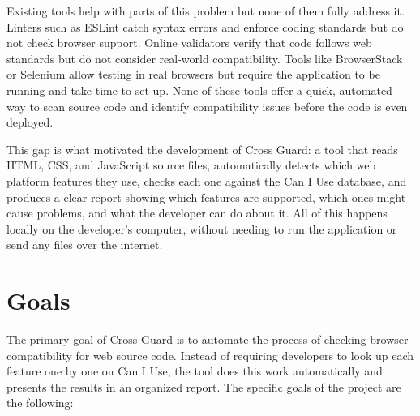 Existing tools help with parts of this problem but none of them fully address it. Linters such as ESLint catch syntax errors and enforce coding standards but do not check browser support. Online validators verify that code follows web standards but do not consider real-world compatibility. Tools like BrowserStack or Selenium allow testing in real browsers but require the application to be running and take time to set up. None of these tools offer a quick, automated way to scan source code and identify compatibility issues before the code is even deployed.

This gap is what motivated the development of Cross Guard: a tool that reads HTML, CSS, and JavaScript source files, automatically detects which web platform features they use, checks each one against the Can I Use database, and produces a clear report showing which features are supported, which ones might cause problems, and what the developer can do about it. All of this happens locally on the developer's computer, without needing to run the application or send any files over the internet.

\section{Goals}
\label{sec:goals}

The primary goal of Cross Guard is to automate the process of checking browser compatibility for web source code. Instead of requiring developers to look up each feature one by one on Can I Use, the tool does this work automatically and presents the results in an organized report. The specific goals of the project are the following:

